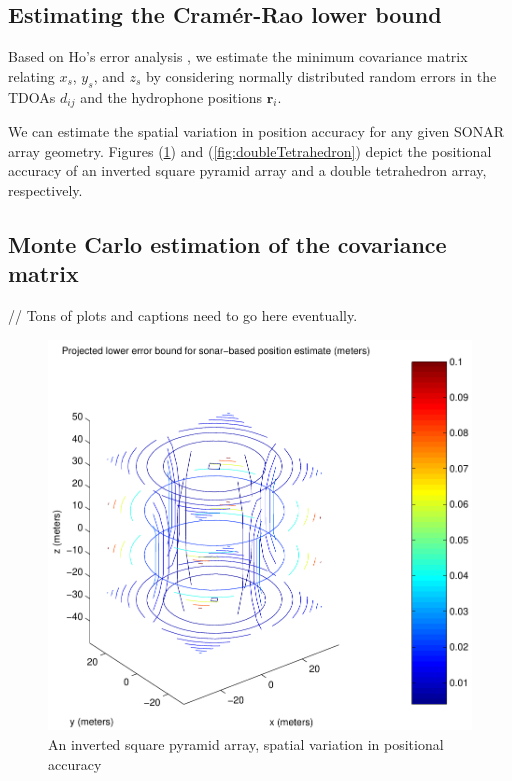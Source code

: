 \documentclass[10pt]{article}
\begin{document}
\subsection{Estimating the Cram\'{e}r-Rao lower bound}

Based on Ho's error analysis \cite{Ho} \cite{Ho:2007lr}, we estimate the minimum covariance matrix relating \(x_s\), \(y_s\), and \(z_s\) by considering normally distributed random errors in the TDOAs \(d_{ij}\) and the hydrophone positions \(\mathbf{r}_i\).

We can estimate the spatial variation in position accuracy for any given SONAR array geometry.  Figures (\ref{fig:squarePyramid}) and (\ref{fig:doubleTetrahedron}) depict the positional accuracy of an inverted square pyramid array and a double tetrahedron array, respectively.

\subsection{Monte Carlo estimation of the covariance matrix}

// Tons of plots and captions need to go here eventually.

\begin{figure}[htbp]
\begin{center}
\includegraphics[scale=0.5]{squarePyramid.pdf}
\caption{An inverted square pyramid array, spatial variation in positional accuracy}
\label{fig:squarePyramid}
\end{center}
\end{figure}
\end{document}
